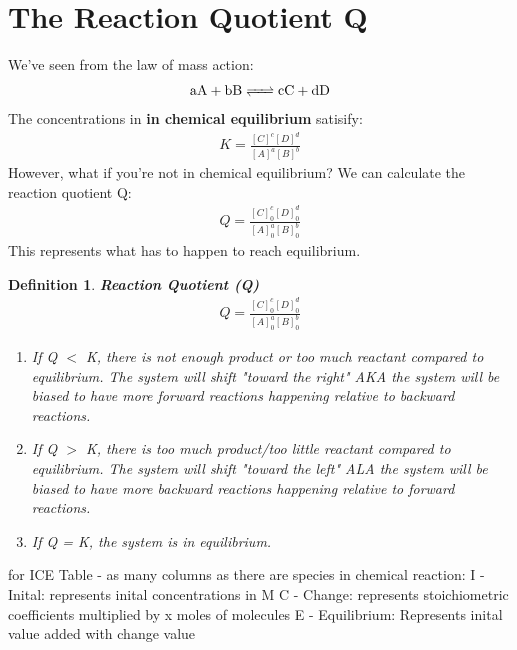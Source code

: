 \documentclass{article}  %
\newtheorem{defn}{Definition}
\begin{document}
\section*{The Reaction Quotient Q}
We've seen from the law of mass action: 
\begin{equation*}
    \begin{aligned}
        \ce{aA + bB <=> cC + dD}
    \end{aligned}
\end{equation*}
The concentrations in \textbf{in chemical equilibrium} satisify:
\begin{equation*}
    \begin{aligned}
        K = \frac{[C]^c[D]^d}{[A]^a[B]^b} 
    \end{aligned}
\end{equation*}
However, what if you're not in chemical equilibrium? We can calculate the reaction quotient Q:
\begin{equation*}
    \begin{aligned}
        Q = \frac{[C]^c_0[D]^d_0}{[A]^a_0[B]^b_0} 
    \end{aligned}
\end{equation*}
This represents what has to happen to reach equilibrium.

\begin{defn}
    \textbf{Reaction Quotient (Q)} 
    \begin{equation*}
        \begin{aligned}
            Q = \frac{[C]^c_0[D]^d_0}{[A]^a_0[B]^b_0} 
        \end{aligned}
    \end{equation*}
    \begin{enumerate}
        \item If Q $<$ K, there is not enough product or too much reactant compared to equilibrium. The system will shift "toward the right" AKA the system will be biased to have more forward reactions happening relative to backward reactions.
        \item If Q $>$ K, there is too much product/too little reactant compared to equilibrium. The system will shift "toward the left" ALA the system will be biased to have more backward reactions happening relative to forward reactions.
        \item If Q = K, the system is in equilibrium.
    \end{enumerate}
\end{defn}

for ICE Table - as many columns as there are species in chemical reaction:
I - Inital: represents inital concentrations in M
C - Change: represents stoichiometric coefficients multiplied by x moles of molecules
E - Equilibrium: Represents inital value added with change value 
\end{document}
